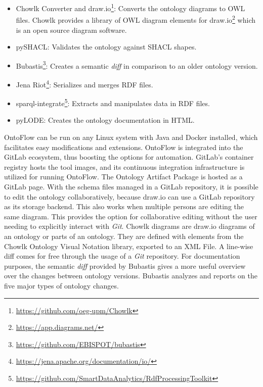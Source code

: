 \documentclass[runningheads]{llncs}
\begin{document}
\begin{itemize}
	\item Chowlk Converter and draw.io\footnote{\url{https://github.com/oeg-upm/Chowlk}}: Converts the ontology diagrams to OWL files. Chowlk\cite{ChavezFeria} provides a library of OWL diagram elements for draw.io\footnote{\url{https://app.diagrams.net/}} which is an open source diagram software.
	\item pySHACL: Validates the ontology against SHACL shapes.
	\item Bubastis\footnote{\url{https://github.com/EBISPOT/bubastis}}: Creates a semantic \textit{diff} in comparison to an older ontology version.
	\item Jena Riot\footnote{\url{https://jena.apache.org/documentation/io/}}: Serializes and merges RDF files.
	\item sparql-integrate\footnote{\url{https://github.com/SmartDataAnalytics/RdfProcessingToolkit}}: Extracts and manipulates data in RDF files.
	\item pyLODE: Creates the ontology documentation in HTML.
\end{itemize}
OntoFlow can be run on any Linux system with Java and Docker installed, which facilitates easy modifications and extensions. OntoFlow is integrated into the GitLab ecosystem, thus boosting the options for automation. GitLab's container registry hosts the tool images, and its continuous integration infrastructure is utilized for running OntoFlow. The Ontology Artifact Package is hosted as a GitLab page. With the schema files managed in a GitLab repository, it is possible to edit the ontology collaboratively, because draw.io can use a GitLab repository as its storage backend. This also works when multiple persons are editing the same diagram. This provides the option for collaborative editing without the user needing to explicitly interact with \textit{Git}. Chowlk diagrams are draw.io diagrams of an ontology or parts of an ontology. They are defined with elements from the Chowlk Ontology Visual Notation library, exported to an XML File. A line-wise diff comes for free through the usage of a \textit{Git} repository. For documentation purposes, the semantic \textit{diff} provided by Bubastis\cite{malone} gives a more useful overview over the changes between ontology versions. Bubastis analyzes and reports on the five major types of ontology changes.
\end{document}
